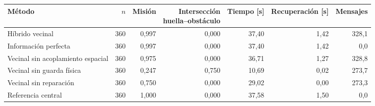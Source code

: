 \begin{tabular}{lrrrrrr}
\toprule
Método & $n$ & Misión & \shortstack{Intersección\\huella--obstáculo} & Tiempo [s] & Recuperación [s] & Mensajes \\
\midrule
Híbrido vecinal & 360 & 0{,}997 & 0{,}000 & 37{,}40 & 1{,}42 & 328{,}1 \\
Información perfecta & 360 & 0{,}997 & 0{,}000 & 37{,}40 & 1{,}42 & 0{,}0 \\
Vecinal sin acoplamiento espacial & 360 & 0{,}975 & 0{,}000 & 36{,}71 & 1{,}27 & 328{,}8 \\
Vecinal sin guarda física & 360 & 0{,}247 & 0{,}750 & 10{,}69 & 0{,}02 & 273{,}7 \\
Vecinal sin reparación & 360 & 0{,}750 & 0{,}000 & 29{,}02 & 0{,}00 & 273{,}3 \\
Referencia central & 360 & 1{,}000 & 0{,}000 & 37{,}58 & 1{,}50 & 0{,}0 \\
\bottomrule
\end{tabular}
